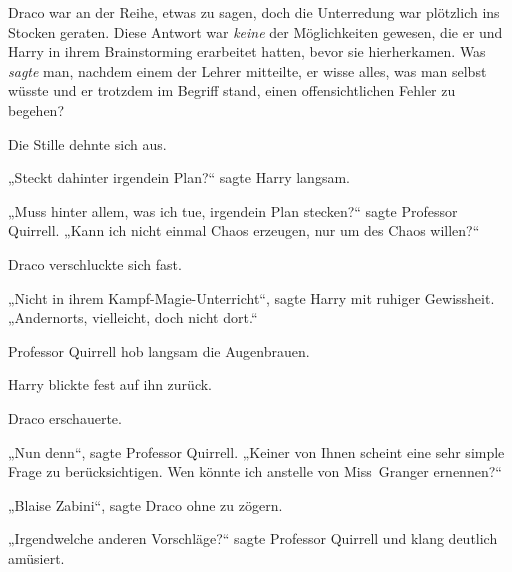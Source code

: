 Draco war an der Reihe, etwas zu sagen, doch die Unterredung war plötzlich ins Stocken geraten. Diese Antwort war \emph{keine} der Möglichkeiten gewesen, die er und Harry in ihrem Brainstorming erarbeitet hatten, bevor sie hierherkamen. Was \emph{sagte} man, nachdem einem der Lehrer mitteilte, er wisse alles, was man selbst wüsste und er trotzdem im Begriff stand, einen offensichtlichen Fehler zu begehen?

Die Stille dehnte sich aus.

„Steckt dahinter irgendein Plan?“ sagte Harry langsam.

„Muss hinter allem, was ich tue, irgendein Plan stecken?“ sagte Professor Quirrell. „Kann ich nicht einmal Chaos erzeugen, nur um des Chaos willen?“

Draco verschluckte sich fast.

„Nicht in ihrem Kampf-Magie-Unterricht“, sagte Harry mit ruhiger Gewissheit. „Andernorts, vielleicht, doch nicht dort.“

Professor Quirrell hob langsam die Augenbrauen.

Harry blickte fest auf ihn zurück.

Draco erschauerte.

„Nun denn“, sagte Professor Quirrell. „Keiner von Ihnen scheint eine sehr simple Frage zu berücksichtigen. Wen könnte ich anstelle von Miss~Granger ernennen?“

„Blaise Zabini“, sagte Draco ohne zu zögern.

„Irgendwelche anderen Vorschläge?“ sagte Professor Quirrell und klang deutlich amüsiert.

